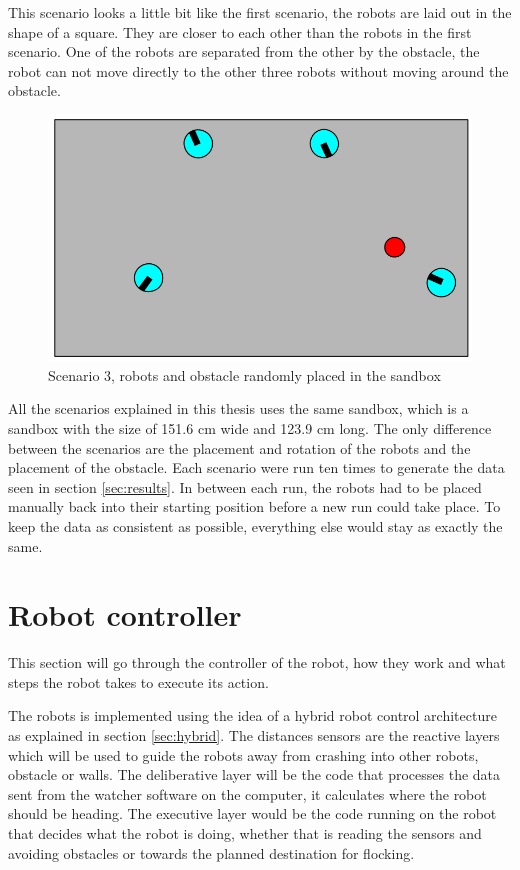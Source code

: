 This scenario looks a little bit like the first scenario, the robots are laid out in the shape of a square. They are closer to each other than the robots in the first scenario. One of the robots are separated from the other by the obstacle, the robot can not move directly to the other three robots without moving around the obstacle.
\begin{figure}[h!]
\begin{center}
\includegraphics[width=0.8\linewidth]{figs/scenario2}
\end{center}
\caption[scenario 3]{Scenario 3, robots and obstacle randomly placed in the sandbox}
\label{fig:scenario3}
\end{figure}

All the scenarios explained in this thesis uses the same sandbox, which is a sandbox with the size of 151.6 cm wide and 123.9 cm long. The only difference between the scenarios are the placement and rotation of the robots and the placement of the obstacle. Each scenario were run ten times to generate the data seen in section \ref{sec:results}.
In between each run, the robots had to be placed manually back into their starting position before a new run could take place. To keep the data as consistent as possible, everything else would stay as exactly the same.

\section{Robot controller}
This section will go through the controller of the robot, how they work and what steps the robot takes to execute its action.

The robots is implemented using the idea of a hybrid robot control architecture as explained in section \ref{sec:hybrid}. The distances sensors are the reactive layers which will be used to guide the robots away from crashing into other robots, obstacle or walls. The deliberative layer will be the code that processes the data sent from the watcher software on the computer, it calculates where the robot should be heading. The executive layer would be the code running on the robot that decides what the robot is doing, whether that is reading the sensors and avoiding obstacles or towards the planned destination for flocking.

